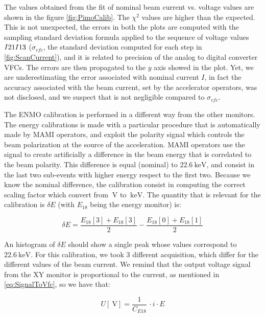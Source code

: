 The values obtained from the fit of nominal beam current vs. voltage values are shown in the figure \ref{fig:PimoCalib}. The $\chi^{2}$ values are higher than the expected. This is not unexpected, the errors in both the plots are computed with the sampling standard deviation formula applied to the sequence of voltage values $I21\/ I13$ ($\sigma_{vfc}$, the standard deviation computed for each step in \ref{fig:ScanCurrent}), and it is related to precision of the analog to digital converter VFCs. The errors are then propagated to the $y$ axis showed in the plot. \smallskip
Yet, we are underestimating the error associated with nominal current $I$, in fact the accuracy associated with the beam current, set by the accelerator operators, was not disclosed, and we suspect that is not negligible compared to $\sigma_{vfc}$. \bigskip  

The ENMO calibration is performed in a different way from the other monitors. The energy calibrations is made with a particular procedure that is automatically made by MAMI operators, and exploit the polarity signal which controls the beam polarization at the source of the acceleration. MAMI operators use the signal to create artificially a difference in the beam energy that is correlated to the beam polarity. This difference is equal (nominal) to $\SI{22.6}{\kilo \electronvolt}$, and consist in the last two sub-events with higher energy respect to the first two. Because we know the nominal difference, the calibration consist in computing the correct scaling factor which convert from $\SI{}{\volt}$ to $\SI{}{\kilo \electronvolt}$. The quantity that is relevant for the calibration is $\delta E$ (with $E_{18}$ being the energy monitor) is:

\begin{equation*}
\delta E = \frac{E_{18}[3] + E_{18}[3]}{2} - \frac{E_{18}[0] + E_{18}[1]}{2} 
\end{equation*}

An histogram of $\delta E$ should show a single peak whose values correspond to $\SI{22.6}{\kilo \electronvolt}$.
For this calibration, we took 3 different acquisition, which differ for the different values of the beam current. We remind that the output voltage signal from the XY monitor is proportional to the current, as mentioned in \ref{eq:SignalToVfc}, so we have that:

\begin{equation}
U[\SI{}{\volt}] = \frac{1}{C_{E18}} \, \cdot  i \cdot E
\end{equation}

